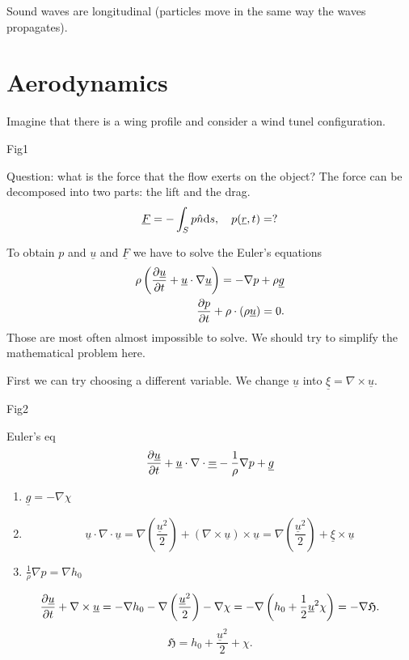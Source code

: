 \documentclass[11pt,oneside]{book}
\renewcommand{\vec}[1]{\underline{#1}}
\theoremstyle{definition} %
\theoremstyle{plain} %
\theoremstyle{remark} %
\theoremstyle{underline}
\begin{document}
  Sound waves are longitudinal (particles move in the same way the waves propagates).

  \section{Aerodynamics}

  Imagine that there is a wing profile and consider a wind tunel configuration.

  \todo Fig1

  Question: what is the force that the flow exerts on the object?
  The force can be decomposed into two parts: the lift and the drag.
  \begin{displaymath}
    \vec F = -\int_S p \hat{n} \d s, \quad p(\vec r, t) = ?
  \end{displaymath}

  To obtain $p$ and $\vec u$ and $\vec F$ we have to solve the Euler's equations
  \begin{align*}
    \rho\left( \ptf{\vec u}{t} + \vec u \cdot \nabla \vec u \right) = - \nabla p + \rho \vec g\\
    \ptf{p}{t} + \rho \cdot (\rho \vec u) = 0.
  \end{align*}
  Those are most often almost impossible to solve.
  We should try to simplify the mathematical problem here.

  First we can try choosing a different variable.
  We change $\vec u$ into  $\vec \xi = \nabla \times \vec u$.
  
  \todo Fig2

  Euler's eq
  \begin{displaymath}
    \ptf{\vec u}{t}+ \vec u \cdot \nabla \cdot \vec = - \frac{1}{\rho} \nabla p + \vec g
  \end{displaymath}
  \begin{enumerate}
    \item $ \vec g = - \nabla \chi$
    \item 
      \begin{displaymath}
        \vec u \cdot \nabla \cdot \vec u = \nabla \left( \frac{\vec u^2}{2} \right) + (\nabla \times \vec u) \times \vec u 
        = \nabla \left( \frac{\vec u^2}{2} \right) + \vec \xi \times \vec u
      \end{displaymath}
    \item $ \frac{1}{\rho} \nabla p = \nabla h_0$
  \end{enumerate}
  \begin{displaymath}
    \ptf{\vec u}{t} + \nabla \times \vec u = - \nabla h_0 - \nabla \left( \frac{\vec u^2}{2} \right) - \nabla \chi
    = - \nabla \left( h_0 + \frac{1}{2} \vec u^2 \chi \right) = - \nabla  \mathfrak{H}.
  \end{displaymath}
  \begin{displaymath}
    \mathfrak{H} = h_0 + \frac{ \vec u^2}{2} + \chi .
  \end{displaymath}
\end{document}
